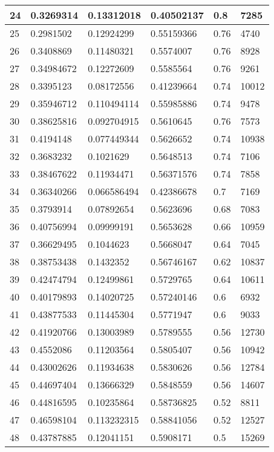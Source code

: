 \begin{longtable}{|l|l|l|l|l|l|}
24 & 0.3269314 & 0.13312018 & 0.40502137 & 0.8 & 7285 \\ \hline 
25 & 0.2981502 & 0.12924299 & 0.55159366 & 0.76 & 4740 \\ \hline 
26 & 0.3408869 & 0.11480321 & 0.5574007 & 0.76 & 8928 \\ \hline 
27 & 0.34984672 & 0.12272609 & 0.5585564 & 0.76 & 9261 \\ \hline 
28 & 0.3395123 & 0.08172556 & 0.41239664 & 0.74 & 10012 \\ \hline 
29 & 0.35946712 & 0.110494114 & 0.55985886 & 0.74 & 9478 \\ \hline 
30 & 0.38625816 & 0.092704915 & 0.5610645 & 0.76 & 7573 \\ \hline 
31 & 0.4194148 & 0.077449344 & 0.5626652 & 0.74 & 10938 \\ \hline 
32 & 0.3683232 & 0.1021629 & 0.5648513 & 0.74 & 7106 \\ \hline 
33 & 0.38467622 & 0.11934471 & 0.56371576 & 0.74 & 7858 \\ \hline 
34 & 0.36340266 & 0.066586494 & 0.42386678 & 0.7 & 7169 \\ \hline 
35 & 0.3793914 & 0.07892654 & 0.5623696 & 0.68 & 7083 \\ \hline 
36 & 0.40756994 & 0.09999191 & 0.5653628 & 0.66 & 10959 \\ \hline 
37 & 0.36629495 & 0.1044623 & 0.5668047 & 0.64 & 7045 \\ \hline 
38 & 0.38753438 & 0.1432352 & 0.56746167 & 0.62 & 10837 \\ \hline 
39 & 0.42474794 & 0.12499861 & 0.5729765 & 0.64 & 10611 \\ \hline 
40 & 0.40179893 & 0.14020725 & 0.57240146 & 0.6 & 6932 \\ \hline 
41 & 0.43877533 & 0.11445304 & 0.5771947 & 0.6 & 9033 \\ \hline 
42 & 0.41920766 & 0.13003989 & 0.5789555 & 0.56 & 12730 \\ \hline 
43 & 0.4552086 & 0.11203564 & 0.5805407 & 0.56 & 10942 \\ \hline 
44 & 0.43002626 & 0.11934638 & 0.5830626 & 0.56 & 12784 \\ \hline 
45 & 0.44697404 & 0.13666329 & 0.5848559 & 0.56 & 14607 \\ \hline 
46 & 0.44816595 & 0.10235864 & 0.58736825 & 0.52 & 8811 \\ \hline 
47 & 0.46598104 & 0.113232315 & 0.58841056 & 0.52 & 12527 \\ \hline 
48 & 0.43787885 & 0.12041151 & 0.5908171 & 0.5 & 15269 \\ \hline 

\end{longtable}
